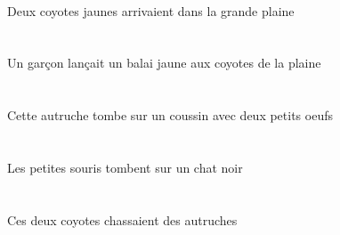 \begin{exe}
\INDDuAbsG{}   \jauneCDuG{}   \coyoteCDuAbsG{}    \DEFSgOblG{}   \grandASgG{}   \plaineASgOblG{}   \DANSG{}  \arriverViPstCDuG{}\\
Deux coyotes jaunes arrivaient dans la grande plaine
\ex\glll
\INDSgErg{}   \garconDSgErg{}    \DEFPlDat{}    \DEFSgObl{}   \plaineASgObl{}   \DE{}   \coyoteCPlDat{}   \INDSgAbs{}   \jauneASg{}   \balaiASgAbs{}  \lancerVdPstASg{}\\
\INDSgErgP{}   \garconDSgErgP{}    \DEFPlDatP{}    \DEFSgOblP{}   \plaineASgOblP{}   \DEP{}   \coyoteCPlDatP{}   \INDSgAbsP{}   \jauneASgP{}   \balaiASgAbsP{}  \lancerVdPstASgP{}\\
\INDSgErgG{}   \garconDSgErgG{}    \DEFPlDatG{}    \DEFSgOblG{}   \plaineASgOblG{}   \DEG{}   \coyoteCPlDatG{}   \INDSgAbsG{}   \jauneASgG{}   \balaiASgAbsG{}  \lancerVdPstASgG{}\\
Un garçon lançait un balai jaune aux coyotes de la plaine
\ex\glll
\INDDuObl{}   \petitCDu{}   \oeufCDuObl{}   \AVEC{}   \DEMSgAbs{}   \autrucheBSgAbs{}    \INDSgObl{}   \coussinBSgObl{}   \SUR{}  \tomberViPrsBSg{}\\
\INDDuOblP{}   \petitCDuP{}   \oeufCDuOblP{}   \AVECP{}   \DEMSgAbsP{}   \autrucheBSgAbsP{}    \INDSgOblP{}   \coussinBSgOblP{}   \SURP{}  \tomberViPrsBSgP{}\\
\INDDuOblG{}   \petitCDuG{}   \oeufCDuOblG{}   \AVECG{}   \DEMSgAbsG{}   \autrucheBSgAbsG{}    \INDSgOblG{}   \coussinBSgOblG{}   \SURG{}  \tomberViPrsBSgG{}\\
Cette autruche tombe sur un coussin avec deux petits oeufs
\ex\glll
\DEFPlAbs{}   \petitBPl{}   \sourisBPlAbs{}    \INDSgObl{}   \noirDSg{}   \chatDSgObl{}   \SUR{}  \tomberViPrsBPl{}\\
\DEFPlAbsP{}   \petitBPlP{}   \sourisBPlAbsP{}    \INDSgOblP{}   \noirDSgP{}   \chatDSgOblP{}   \SURP{}  \tomberViPrsBPlP{}\\
\DEFPlAbsG{}   \petitBPlG{}   \sourisBPlAbsG{}    \INDSgOblG{}   \noirDSgG{}   \chatDSgOblG{}   \SURG{}  \tomberViPrsBPlG{}\\
Les petites souris tombent sur un chat noir
\ex\glll
\DEMDuErg{}   \coyoteCDuErg{}   \INDPlAbs{}   \autrucheBPlAbs{}  \chasserVtPstBPl{}\\
\DEMDuErgP{}   \coyoteCDuErgP{}   \INDPlAbsP{}   \autrucheBPlAbsP{}  \chasserVtPstBPlP{}\\
\DEMDuErgG{}   \coyoteCDuErgG{}   \INDPlAbsG{}   \autrucheBPlAbsG{}  \chasserVtPstBPlG{}\\
Ces deux coyotes chassaient des autruches
\ex\glll
\DEFPlErg{}   \coyoteCPlErg{}    \DEMPlDat{}   \chatDPlDat{}   \INDSgAbs{}   \sourisBSgAbs{}  \lancerVdPstBSg{}\\

\end{exe}
